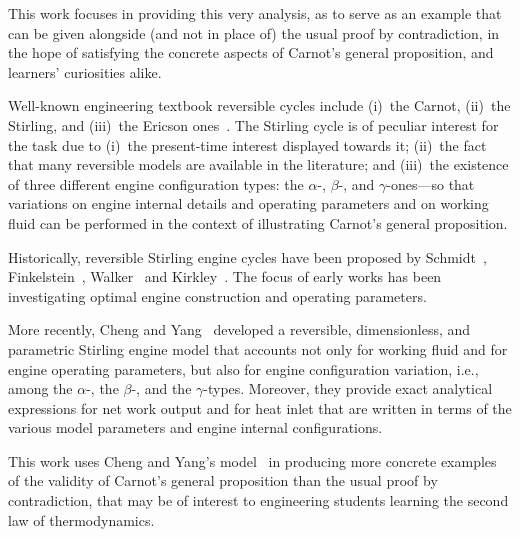     This work focuses in providing this very analysis, as to serve as an  example  that  can  be
    given alongside (and not in place of) the usual proof  by  contradiction,  in  the  hope  of
    satisfying the concrete aspects of Carnot's general proposition, and  learners'  curiosities
    alike.

    Well-known engineering textbook reversible cycles include (i)~the Carnot, (ii)~the Stirling,
    and (iii)~the Ericson  ones~\cite{2013-CengelYA+BolesMA-AMGH}.  The  Stirling  cycle  is  of
    peculiar interest for the task due to (i)~the present-time interest  displayed  towards  it;
    (ii)~the fact that many reversible models are available in  the  literature;  and  (iii)~the
    existence of three different  engine  configuration  types:  the  $\alpha$-,  $\beta$-,  and
    $\gamma$-ones---so that variations on engine internal details and operating  parameters  and
    on working  fluid  can  be  performed  in  the  context  of  illustrating  Carnot's  general
    proposition.

    Historically,   reversible    Stirling    engine    cycles    have    been    proposed    by
    Schmidt~\cite{1871-SchmidtG-ZeitVerDeutschIng},                                             
    Finkelstein~\cite{1960-FinkelsteinT-SAEIntl},   Walker~\cite{1962-WalkerG-JMechEngSci}   and
    Kirkley~\cite{1962-KirkleyDW-JMechEngSci}. The focus of early works has  been  investigating
    optimal engine construction and operating parameters.

    More recently, Cheng and Yang~\cite{2012-ChengCH+YangHS-ApEnergy}  developed  a  reversible,
    dimensionless, and parametric Stirling engine model that accounts not only for working fluid
    and for engine operating parameters, but also  for  engine  configuration  variation,  i.e.,
    among the $\alpha$-, the $\beta$-, and the  $\gamma$-types.  Moreover,  they  provide  exact
    analytical expressions for net work output and for heat inlet that are written in  terms  of
    the various model parameters and engine internal configurations.

    This work uses Cheng and Yang's model~\cite{2012-ChengCH+YangHS-ApEnergy} in producing  more
    concrete examples of the validity of Carnot's general proposition than the  usual  proof  by
    contradiction, that may be of interest to engineering students learning the  second  law  of
    thermodynamics.


